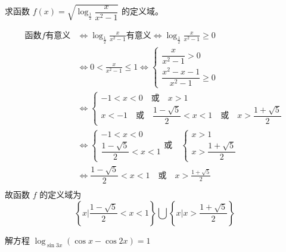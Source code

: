 \begin{example}
  求函数 $f(x)=\sqrt{\log_{\tfrac{1}{2}}\dfrac{x}{x^2-1}}$ 的定义域。
\end{example}

\begin{solution}
\[\begin{split}
  \text{函数$f$有意义}&\Longleftrightarrow \log_{\tfrac{1}{2}}\frac{x}{x^2-1}\text{有意义}\Longleftrightarrow \log_{\tfrac{1}{2}}\frac{x}{x^2-1}\geqslant 0\\
  &\Longleftrightarrow  0<   \frac{x}{x^2-1}\leqslant1    \Longleftrightarrow  \begin{cases}
    \dfrac{x}{x^2-1}>0\\ \dfrac{x^2-x-1}{x^2-1}\geqslant 0
  \end{cases}           \\
  &\Longleftrightarrow     \begin{cases}
    -1<x<0\quad \text{或}\quad x>1\\
    x<-1\quad \text{或}\quad \dfrac{1-\sqrt{5}}{2}<x<1\quad \text{或}\quad x>\dfrac{1+\sqrt{5}}{2}
  \end{cases}               \\
  &\Longleftrightarrow   \begin{cases}
    -1<x<0\\  \dfrac{1-\sqrt{5}}{2}<x<1
  \end{cases}      \text{或}\quad  \begin{cases}
    x>1\\x>\dfrac{1+\sqrt{5}}{2}
  \end{cases}           \\
  &\Longleftrightarrow    \dfrac{1-\sqrt{5}}{2}<x<1  \quad \text{或}\quad   x>\frac{1+\sqrt{5}}{2}   \\
\end{split}\]
故函数 $f$ 的定义域为
\[\left\{x\Big| \frac{1-\sqrt{5}}{2}<x<1 \right\}\bigcup\left\{x\Big|x>\frac{1+\sqrt{5}}{2}  \right\}\]
\end{solution}


\begin{example}
  解方程 $\log_{\sin 3x}(\cos x-\cos2x)=1$
\end{example}


